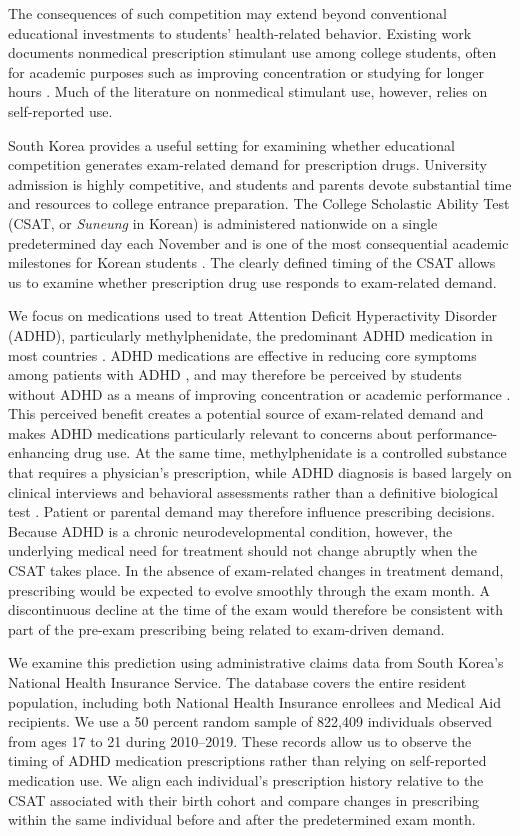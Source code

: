 \documentclass[12pt]{article}
\begin{document}
The consequences of such competition may extend beyond conventional educational investments to students' health-related behavior. Existing work documents nonmedical prescription stimulant use among college students, often for academic purposes such as improving concentration or studying for longer hours \citep{mccabe2005,desantis2008,rabiner2009}. Much of the literature on nonmedical stimulant use, however, relies on self-reported use.

South Korea provides a useful setting for examining whether educational competition generates exam-related demand for prescription drugs. University admission is highly competitive, and students and parents devote substantial time and resources to college entrance preparation. The College Scholastic Ability Test (CSAT, or \textit{Suneung} in Korean) is administered nationwide on a single predetermined day each November and is one of the most consequential academic milestones for Korean students \citep{kwon2017}. The clearly defined timing of the CSAT allows us to examine whether prescription drug use responds to exam-related demand.

We focus on medications used to treat Attention Deficit Hyperactivity Disorder (ADHD), particularly methylphenidate, the predominant ADHD medication in most countries \citep{raman2018,song2016}. ADHD medications are effective in reducing core symptoms among patients with ADHD \citep{faraone2015}, and may therefore be perceived by students without ADHD as a means of improving concentration or academic performance \citep{smith2011}. This perceived benefit creates a potential source of exam-related demand and makes ADHD medications particularly relevant to concerns about performance-enhancing drug use. At the same time, methylphenidate is a controlled substance that requires a physician's prescription, while ADHD diagnosis is based largely on clinical interviews and behavioral assessments rather than a definitive biological test \citep{faraone2015,lee2017}. Patient or parental demand may therefore influence prescribing decisions. Because ADHD is a chronic neurodevelopmental condition, however, the underlying medical need for treatment should not change abruptly when the CSAT takes place. In the absence of exam-related changes in treatment demand, prescribing would be expected to evolve smoothly through the exam month. A discontinuous decline at the time of the exam would therefore be consistent with part of the pre-exam prescribing being related to exam-driven demand.

We examine this prediction using administrative claims data from South Korea's National Health Insurance Service. The database covers the entire resident population, including both National Health Insurance enrollees and Medical Aid recipients. We use a 50 percent random sample of 822,409 individuals observed from ages 17 to 21 during 2010--2019. These records allow us to observe the timing of ADHD medication prescriptions rather than relying on self-reported medication use. We align each individual's prescription history relative to the CSAT associated with their birth cohort and compare changes in prescribing within the same individual before and after the predetermined exam month.
\end{document}
